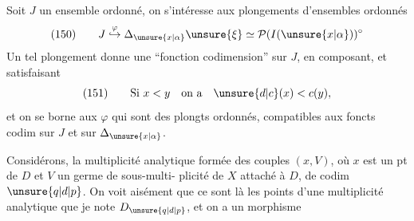 Soit $J$ un ensemble ordonné, on s'intéresse aux plongements d'ensembles ordonnés
\[
(150)\qquad J\mathrel{\overset{\varphi}{\hookrightarrow}}\Delta_{\unsure{x|\alpha}}\unsure{\xi}\simeq\mathcal P(I(\unsure{x|\alpha}))^\circ
\]
Un tel plongement donne une ``fonction codimension'' sur $J$, en composant,  et  satisfaisant
\[
(151)\qquad\text{Si }x<y\quad\text{on a}\quad\unsure{d|c}(x)<c(y),
\]
et on se borne aux $\varphi$ qui sont des plongts ordonnés, compatibles aux foncts codim sur $J$ et sur $\Delta_{\unsure{x|\alpha}}$.

Considérons,  la multiplicité analytique formée des couples $(x,V)$, où $x$ est un pt de $D$ et $V$ un germe de sous-multi-
plicité de $X$ attaché à $D$, de codim $\unsure{q|d|p}$. On  voit aisément que ce sont  là les points d'une multiplicité analytique que je note $D_{\unsure{q|d|p}}$, et on a un morphisme
